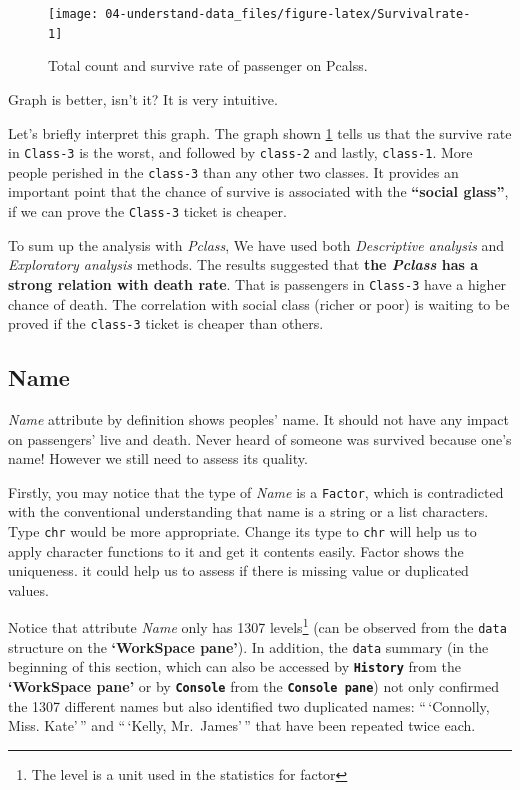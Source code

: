 \documentclass[
]{book}
\begin{document}
\begin{figure}

{\centering \texttt{[image: 04-understand-data\_files/figure-latex/Survivalrate-1]} 

}

\caption{Total count and survive rate of passenger on Pcalss.}\label{fig:Survivalrate}
\end{figure}

Graph is better, isn't it? It is very intuitive.

Let's briefly interpret this graph. The graph shown \ref{fig:Survivalrate} tells us that the survive rate in \texttt{Class-3} is the worst, and followed by \texttt{class-2} and lastly, \texttt{class-1}. More people perished in the \texttt{class-3} than any other two classes. It provides an important point that the chance of survive is associated with the \textbf{``social glass''}, if we can prove the \texttt{Class-3} ticket is cheaper.

To sum up the analysis with \emph{Pclass}, We have used both \emph{Descriptive analysis} and \emph{Exploratory analysis} methods. The results suggested that \textbf{the \emph{Pclass} has a strong relation with death rate}. That is passengers in \texttt{Class-3} have a higher chance of death. The correlation with social class (richer or poor) is waiting to be proved if the \texttt{class-3} ticket is cheaper than others.

\hypertarget{name}{%
\subsection*{Name}\label{name}}


\emph{Name} attribute by definition shows peoples' name. It should not have any impact on passengers' live and death. Never heard of someone was survived because one's name!
However we still need to assess its quality.

Firstly, you may notice that the type of \emph{Name} is a \texttt{Factor}, which is contradicted with the conventional understanding that name is a string or a list characters. Type \texttt{chr} would be more appropriate. Change its type to \texttt{chr} will help us to apply character functions to it and get it contents easily. Factor shows the uniqueness. it could help us to assess if there is missing value or duplicated values.

Notice that attribute \emph{Name} only has 1307 levels\footnote{The level is a unit used in the statistics for factor} (can be observed from the \texttt{data} structure on the \textbf{`WorkSpace pane'}). In addition, the \texttt{data} summary (in the beginning of this section, which can also be accessed by \textbf{\texttt{History}} from the \textbf{`WorkSpace pane'} or by \textbf{\texttt{Console}} from the \textbf{\texttt{Console\ pane}}) not only confirmed the 1307 different names but also identified two duplicated names: ``\,`Connolly, Miss. Kate'\,'' and ``\,`Kelly, Mr.~James'\,'' that have been repeated twice each.
\end{document}
